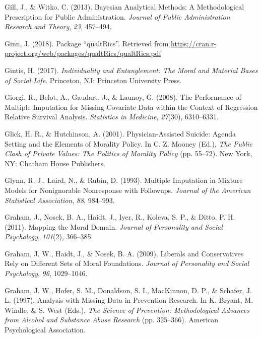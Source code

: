\documentclass[12pt,econ]{sources/authesis}
\begin{document}
\leavevmode\hypertarget{ref-gill_2013_bayesian}{}%
Gill, J., \& Witko, C. (2013). Bayesian Analytical Methods: A Methodological Prescription for Public Administration. \emph{Journal of Public Administration Research and Theory}, \emph{23}, 457--494.

\leavevmode\hypertarget{ref-ginn_2018_package}{}%
Ginn, J. (2018). Package ``qualtRics''. Retrieved from \url{https://cran.r-project.org/web/packages/qualtRics/qualtRics.pdf}

\leavevmode\hypertarget{ref-gintis_2017_individuality}{}%
Gintis, H. (2017). \emph{Individuality and Entanglement: The Moral and Material Bases of Social Life}. Princeton, NJ: Princeton University Press.

\leavevmode\hypertarget{ref-giorgi_2008_performance}{}%
Giorgi, R., Belot, A., Gaudart, J., \& Launoy, G. (2008). The Performance of Multiple Imputation for Missing Covariate Data within the Context of Regression Relative Survival Analysis. \emph{Statistics in Medicine}, \emph{27}(30), 6310--6331.

\leavevmode\hypertarget{ref-glick_2001_physician-assisted}{}%
Glick, H. R., \& Hutchinson, A. (2001). Physician-Assisted Suicide: Agenda Setting and the Elements of Morality Policy. In C. Z. Mooney (Ed.), \emph{The Public Clash of Private Values: The Politics of Morality Policy} (pp. 55--72). New York, NY: Chatham House Publishers.

\leavevmode\hypertarget{ref-glynn_1993_multiple}{}%
Glynn, R. J., Laird, N., \& Rubin, D. (1993). Multiple Imputation in Mixture Models for Nonignorable Nonresponse with Followups. \emph{Journal of the American Statistical Association}, \emph{88}, 984--993.

\leavevmode\hypertarget{ref-graham_2011_mapping}{}%
Graham, J., Nosek, B. A., Haidt, J., Iyer, R., Koleva, S. P., \& Ditto, P. H. (2011). Mapping the Moral Domain. \emph{Journal of Personality and Social Psychology}, \emph{101}(2), 366--385.

\leavevmode\hypertarget{ref-graham_2009_liberals}{}%
Graham, J. W., Haidt, J., \& Nosek, B. A. (2009). Liberals and Conservatives Rely on Different Sets of Moral Foundations. \emph{Journal of Personality and Social Psychology}, \emph{96}, 1029--1046.

\leavevmode\hypertarget{ref-graham_1997_analysis}{}%
Graham, J. W., Hofer, S. M., Donaldson, S. I., MacKinnon, D. P., \& Schafer, J. L. (1997). Analysis with Missing Data in Prevention Research. In K. Bryant, M. Windle, \& S. West (Eds.), \emph{The Science of Prevention: Methodological Advances from Alcohol and Substance Abuse Research} (pp. 325--366). American Psychological Association.
\end{document}
